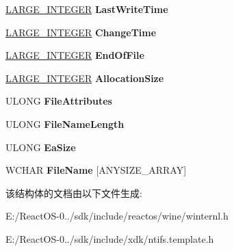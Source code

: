 \begin{DoxyCompactItemize}
\hyperlink{union___l_a_r_g_e___i_n_t_e_g_e_r}{L\+A\+R\+G\+E\+\_\+\+I\+N\+T\+E\+G\+ER} {\bfseries Last\+Write\+Time}
\item 
\mbox{\label{struct___f_i_l_e___f_u_l_l___d_i_r_e_c_t_o_r_y___i_n_f_o_r_m_a_t_i_o_n_a017267e15e5cea4d89b26ae6a57ae6dd}} 
\hyperlink{union___l_a_r_g_e___i_n_t_e_g_e_r}{L\+A\+R\+G\+E\+\_\+\+I\+N\+T\+E\+G\+ER} {\bfseries Change\+Time}
\item 
\mbox{\label{struct___f_i_l_e___f_u_l_l___d_i_r_e_c_t_o_r_y___i_n_f_o_r_m_a_t_i_o_n_ac6a0cd3afeb3930741571f749a9e41e6}} 
\hyperlink{union___l_a_r_g_e___i_n_t_e_g_e_r}{L\+A\+R\+G\+E\+\_\+\+I\+N\+T\+E\+G\+ER} {\bfseries End\+Of\+File}
\item 
\mbox{\label{struct___f_i_l_e___f_u_l_l___d_i_r_e_c_t_o_r_y___i_n_f_o_r_m_a_t_i_o_n_a4ceb6c8e877cc325da85980962100430}} 
\hyperlink{union___l_a_r_g_e___i_n_t_e_g_e_r}{L\+A\+R\+G\+E\+\_\+\+I\+N\+T\+E\+G\+ER} {\bfseries Allocation\+Size}
\item 
\mbox{\label{struct___f_i_l_e___f_u_l_l___d_i_r_e_c_t_o_r_y___i_n_f_o_r_m_a_t_i_o_n_a4157801dd7b19fe4991d57ba17fc63ce}} 
U\+L\+O\+NG {\bfseries File\+Attributes}
\item 
\mbox{\label{struct___f_i_l_e___f_u_l_l___d_i_r_e_c_t_o_r_y___i_n_f_o_r_m_a_t_i_o_n_a9f782a76c2a154b1acb574eb8a6d8079}} 
U\+L\+O\+NG {\bfseries File\+Name\+Length}
\item 
\mbox{\label{struct___f_i_l_e___f_u_l_l___d_i_r_e_c_t_o_r_y___i_n_f_o_r_m_a_t_i_o_n_a1b525959d4b01a5f3dd828281346af46}} 
U\+L\+O\+NG {\bfseries Ea\+Size}
\item 
\mbox{\label{struct___f_i_l_e___f_u_l_l___d_i_r_e_c_t_o_r_y___i_n_f_o_r_m_a_t_i_o_n_adab6d3126c04b57138f5d87640fad241}} 
W\+C\+H\+AR {\bfseries File\+Name} \mbox{[}A\+N\+Y\+S\+I\+Z\+E\+\_\+\+A\+R\+R\+AY\mbox{]}
\end{DoxyCompactItemize}


该结构体的文档由以下文件生成\+:\begin{DoxyCompactItemize}
\item 
E\+:/\+React\+O\+S-\/0../sdk/include/reactos/wine/winternl.\+h\item 
E\+:/\+React\+O\+S-\/0../sdk/include/xdk/ntifs.\+template.\+h\end{DoxyCompactItemize}
